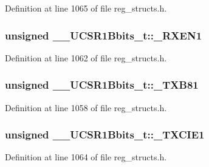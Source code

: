 Definition at line 1065 of file reg\+\_\+structs.\+h.

\hypertarget{union_____u_c_s_r1_bbits__t_a80dab72ba288983a6c28d5ae3c9c684c}{
\subsubsection[{\+\_\+\+R\+X\+E\+N1}]{\setlength{\rightskip}{0pt plus 5cm}unsigned \+\_\+\+\_\+\+U\+C\+S\+R1\+Bbits\+\_\+t\+::\+\_\+\+R\+X\+E\+N1}}\label{union_____u_c_s_r1_bbits__t_a80dab72ba288983a6c28d5ae3c9c684c}


Definition at line 1062 of file reg\+\_\+structs.\+h.

\hypertarget{union_____u_c_s_r1_bbits__t_a45f8c897ae8ffccc94c8eb3c8666e6ec}{
\subsubsection[{\+\_\+\+T\+X\+B81}]{\setlength{\rightskip}{0pt plus 5cm}unsigned \+\_\+\+\_\+\+U\+C\+S\+R1\+Bbits\+\_\+t\+::\+\_\+\+T\+X\+B81}}\label{union_____u_c_s_r1_bbits__t_a45f8c897ae8ffccc94c8eb3c8666e6ec}


Definition at line 1058 of file reg\+\_\+structs.\+h.

\hypertarget{union_____u_c_s_r1_bbits__t_a1524ec6c9ea78733f3b63bb5edc0c556}{
\subsubsection[{\+\_\+\+T\+X\+C\+I\+E1}]{\setlength{\rightskip}{0pt plus 5cm}unsigned \+\_\+\+\_\+\+U\+C\+S\+R1\+Bbits\+\_\+t\+::\+\_\+\+T\+X\+C\+I\+E1}}\label{union_____u_c_s_r1_bbits__t_a1524ec6c9ea78733f3b63bb5edc0c556}


Definition at line 1064 of file reg\+\_\+structs.\+h.

